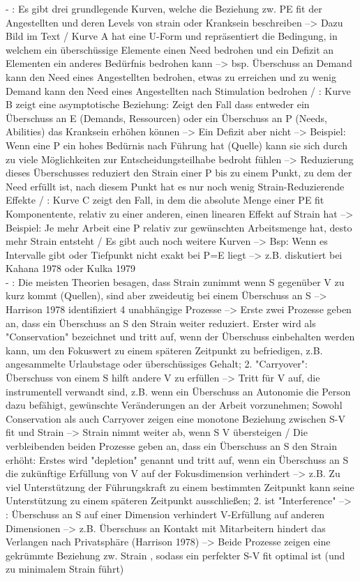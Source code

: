 - \cite[S. 5]{caplan:1987}: Es gibt drei grundlegende Kurven, welche die Beziehung zw. PE fit der Angestellten und deren Levels von strain oder Kranksein beschreiben --> Dazu Bild im Text / Kurve A hat eine U-Form und repräsentiert die Bedingung, in welchem ein überschüssige Elemente einen Need bedrohen und ein Defizit an Elementen ein anderes Bedürfnis bedrohen kann --> bsp. Überschuss an Demand kann den Need eines Angestellten bedrohen, etwas zu erreichen und zu wenig Demand kann den Need eines Angestellten nach Stimulation bedrohen / \cite[S. 5f.]{caplan:1987}: Kurve B zeigt eine asymptotische Beziehung: Zeigt den Fall dass entweder ein Überschuss an E (Demands, Ressourcen) oder ein Überschuss an P (Needs, Abilities) das Kranksein erhöhen können --> Ein Defizit aber nicht --> Beispiel: Wenn eine P ein hohes Bedürnis nach Führung hat (Quelle) kann sie sich durch zu viele Möglichkeiten zur Entscheidungsteilhabe bedroht fühlen --> Reduzierung dieses Überschusses reduziert den Strain einer P bis zu einem Punkt, zu dem der Need erfüllt ist, nach diesem Punkt hat es nur noch wenig Strain-Reduzierende Effekte / \cite[S. 6]{caplan:1987}: Kurve C zeigt den Fall, in dem die absolute Menge einer PE fit Komponentente, relativ zu einer anderen, einen linearen Effekt auf Strain hat --> Beispiel: Je mehr Arbeit eine P relativ zur gewünschten Arbeitsmenge hat, desto mehr Strain entsteht / Es gibt auch noch weitere Kurven --> Bsp: Wenn es Intervalle gibt oder Tiefpunkt nicht exakt bei P=E liegt --> z.B. diskutiert bei Kahana 1978 oder Kulka 1979 \\
- \cite[S. 3]{edwards:1996}: Die meisten Theorien besagen, dass Strain zunimmt wenn S gegenüber V zu kurz kommt (Quellen), sind aber zweideutig bei einem Überschuss an S --> Harrison 1978 identifiziert 4 unabhängige Prozesse --> Erste zwei Prozesse geben an, dass ein Überschuss an S den Strain weiter reduziert. Erster wird als "Conservation" bezeichnet und tritt auf, wenn der Überschuss einbehalten werden kann, um den Fokuswert zu einem späteren Zeitpunkt zu befriedigen, z.B. angesammelte Urlaubstage oder überschüssiges Gehalt; 2. "Carryover": Überschuss von einem S hilft andere V zu erfüllen --> Tritt für V auf, die instrumentell verwandt sind, z.B. wenn ein Überschuss an Autonomie die Person dazu befähigt, gewünschte Veränderungen an der Arbeit vorzunehmen; Sowohl Conservation als auch Carryover zeigen eine monotone Beziehung zwischen S-V fit und Strain --> Strain nimmt weiter ab, wenn S V übersteigen / Die verbleibenden beiden Prozesse geben an, dass ein Überschuss an S den Strain erhöht: Erstes wird "depletion" genannt und tritt auf, wenn ein Überschuss an S die zukünftige Erfüllung von V auf der Fokusdimension verhindert --> z.B. Zu viel Unterstützung der Führungskraft zu einem bestimmten Zeitpunkt kann seine Unterstützung zu einem späteren Zeitpunkt ausschließen; 2. ist "Interference" --> \cite[S. 4]{edwards:1996}: Überschuss an S auf einer Dimension verhindert V-Erfüllung auf anderen Dimensionen --> z.B. Überschuss an Kontakt mit Mitarbeitern hindert das Verlangen nach Privatsphäre (Harrison 1978) --> Beide Prozesse zeigen eine gekrümmte Beziehung zw. Strain , sodass ein perfekter S-V fit optimal ist (und zu minimalem Strain führt) \\
